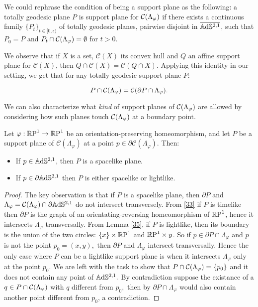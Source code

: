 \begin{observation}\label{diffsupp}
    We could rephrase the condition of being a support plane as the following: a totally geodesic plane $P$ is support plane for $\CF$ if there exists a continuous family $\{P_t\}_{t\in[0,\epsilon)}$ of totally geodesic planes, pairwise disjoint in $\overline{\A^{2,1}}$, such that $P_0=P$ and $P_t\cap\CF=\emptyset$ for $t>0$. 
\end{observation}
We observe that if $X$ is a set, $\mathcal{C}(X)$ its convex hull and $Q$ an affine support plane for $\mathcal{C}(X)$, then $Q\cap\mathcal{C}(X)=\mathcal{C}(Q\cap X).$ Applying this identity in our setting, we get that for any totally geodesic support plane $P$: 

\begin{equation}\label{suplane}
    P\cap\CF=\mathcal{C}(\partial P\cap\Lambda_\varphi).
\end{equation}
    
We can also characterize what \textit{kind} of support planes of $\CF$ are allowed by considering how such planes touch $\CF$ at a boundary point. 
\begin{proposition}\label{supportinho}
    Let $\varphi:\S\to\S$ be an orientation-preserving homeomorphism, and let $P$ be a support plane of $\mathcal{C}(\Lambda_\varphi)$ at a point $p\in\partial\mathcal{C}(\Lambda_\varphi).$ Then:
    \begin{itemize}
        \item If $p\in\A^{2,1}$, then $P$ is a spacelike plane. 
        \item If $p\in\partial\A^{2,1}$ then $P$ is either spacelike or lightlike.
    \end{itemize}
\end{proposition}
\begin{proof}
    The key observation is that if $P$ is a spacelike plane, then $\partial P$ and $\Lambda_\varphi=\CF\cap\partial\A^{2,1}$ do not intersect transversely. From \ref{33} if $P$ is timelike then $\partial P$ is the graph of an orientating-reversing homeomorphism of $\S$, hence it intersects $\Lambda_\varphi$ transversally. From Lemma \ref{35}, if $P$ is lightlike, then its boundary is the union of the two circles: $\{x\}\times\S$ and $\S\times{y}$. So if $p\in\partial P\cap\Lambda_\varphi$ and $p$ is not the point $p_0=(x,y),$ then $\partial P$ and $\Lambda_\varphi$ intersect transversally. Hence the only case where $P$ can be a lightlike support plane is when it intersects $\Lambda_\varphi$ only at the point $p_0.$ We are left with the task to show that $P\cap\CF=\{p_0\}$ and it does not contain any point of $\A^{2,1}.$ By contradiction suppose the existance of a $q\in P\cap\CF$ with $q$ different from $p_0,$ then by  $\partial P\cap\Lambda_\varphi$ would also contain another point different from $p_0$, a contradiction.
\end{proof}

